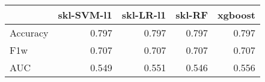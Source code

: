 \begin{tabular}{lrrrr}
\toprule
{} &  skl-SVM-l1 &  skl-LR-l1 &  skl-RF &  xgboost \\
\midrule
Accuracy &       0.797 &      0.797 &   0.797 &    0.797 \\
F1w      &       0.707 &      0.707 &   0.707 &    0.707 \\
AUC      &       0.549 &      0.551 &   0.546 &    0.556 \\
\bottomrule
\end{tabular}
